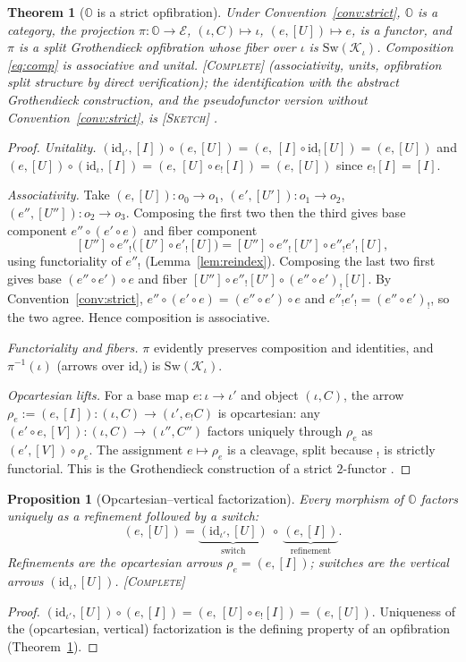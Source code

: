 \documentclass[11pt]{article}
\newtheorem{theorem}{Theorem}
\newtheorem{proposition}{Proposition}
\theoremstyle{definition}
\theoremstyle{remark}
\newcommand{\K}{\mathcal K}
\newcommand{\Ecat}{\mathcal E}
\newcommand{\Oc}{\mathbb O}
\newcommand{\Sw}{\mathrm{Sw}}
\newcommand{\id}{\mathrm{id}}
\newcommand{\pushf}[1]{{#1}_{!}}
\newcommand{\STC}{{\normalfont\textsc{[Complete]}}}
\newcommand{\STS}{{\normalfont\textsc{[Sketch]}}}
\begin{document}
\begin{theorem}[$\Oc$ is a strict opfibration]\label{thm:opfib}
Under Convention~\ref{conv:strict}, $\Oc$ is a category, the projection
$\pi:\Oc\to\Ecat$, $(\iota,C)\mapsto\iota$, $(e,[U])\mapsto e$, is a functor, and
$\pi$ is a split Grothendieck opfibration whose fiber over $\iota$ is $\Sw(\K_\iota)$.
Composition \eqref{eq:comp} is associative and unital. \STC{} (associativity, units,
opfibration split structure by direct verification); the identification with the
abstract Grothendieck construction, and the pseudofunctor version without
Convention~\ref{conv:strict}, is \STS{} \cite{SGA1,JacobsBook,Johnstone}.
\end{theorem}
\begin{proof}
\emph{Unitality.} $(\id_{\iota'},[I])\circ(e,[U])=(e,\,[I]\circ\pushf{\id}[U])=(e,[U])$
and $(e,[U])\circ(\id_\iota,[I])=(e,\,[U]\circ\pushf e[I])=(e,[U])$ since $\pushf
e[I]=[I]$.

\emph{Associativity.} Take $(e,[U]):o_0\to o_1$, $(e',[U']):o_1\to o_2$,
$(e'',[U'']):o_2\to o_3$. Composing the first two then the third gives base component
$e''\circ(e'\circ e)$ and fiber component
\[
[U'']\circ\pushf{e''}\!\bigl([U']\circ\pushf{e'}[U]\bigr)
=[U'']\circ\pushf{e''}[U']\circ\pushf{e''}\pushf{e'}[U],
\]
using functoriality of $\pushf{e''}$ (Lemma~\ref{lem:reindex}). Composing the last two
first gives base $ (e''\circ e')\circ e$ and fiber
$[U'']\circ\pushf{e''}[U']\circ\pushf{(e''\circ e')}[U]$. By Convention~\ref{conv:strict},
$e''\circ(e'\circ e)=(e''\circ e')\circ e$ and
$\pushf{e''}\pushf{e'}=\pushf{(e''\circ e')}$, so the two agree. Hence composition is
associative.

\emph{Functoriality and fibers.} $\pi$ evidently preserves composition and identities,
and $\pi^{-1}(\iota)$ (arrows over $\id_\iota$) is $\Sw(\K_\iota)$.

\emph{Opcartesian lifts.} For a base map $e:\iota\to\iota'$ and object
$(\iota,C)$, the arrow $\rho_e:=(e,[I]):(\iota,C)\to(\iota',\pushf e C)$ is opcartesian:
any $(e'\circ e,[V]):(\iota,C)\to(\iota'',C'')$ factors uniquely through $\rho_e$ as
$(e',[V])\circ\rho_e$. The assignment $e\mapsto\rho_e$ is a cleavage, split because
$\pushf{}$ is strictly functorial. This is the Grothendieck construction of a strict
$2$-functor \cite{SGA1,JacobsBook}. \end{proof}

\begin{proposition}[Opcartesian--vertical factorization]\label{prop:fact}
Every morphism of $\Oc$ factors uniquely as a refinement followed by a switch:
\[
(e,[U])=\underbrace{(\id_{\iota'},[U])}_{\text{switch}}\ \circ\
\underbrace{(e,[I])}_{\text{refinement}}.
\]
Refinements are the opcartesian arrows $\rho_e=(e,[I])$; switches are the vertical
arrows $(\id_\iota,[U])$. \STC
\end{proposition}
\begin{proof}
$(\id_{\iota'},[U])\circ(e,[I])=(e,\,[U]\circ\pushf e[I])=(e,[U])$. Uniqueness of the
(opcartesian, vertical) factorization is the defining property of an opfibration
(Theorem~\ref{thm:opfib}). \end{proof}
\end{document}
